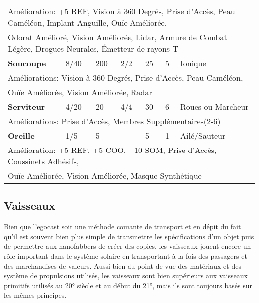 \begin{table}
\begin{tabular}{|l|l|l|l|l|l|l|}
\multicolumn{7}{|l|}{Amélioration: +5 REF, Vision à 360 Degrés, Prise d'Accès, Peau Caméléon, Implant Anguille, Ouïe Améliorée, } \\ \multicolumn{7}{|l|}{Odorat Amélioré, Vision Améliorée, Lidar, Armure de Combat Légère, Drogues Neurales, Émetteur de rayons-T} \\ \hline

\textbf{Soucoupe}	&8/40	&200	&2/2	&25	&5	&Ionique \\ \hline

\multicolumn{7}{|l|}{Améliorations: Vision à 360 Degrés, Prise d'Accès, Peau Caméléon, } \\ \multicolumn{7}{|l|}{Ouïe Améliorée, Vision Améliorée, Radar} \\ \hline

\textbf{Serviteur}	&4/20	&20	&4/4	&30	&6	&Roues ou Marcheur\\ \hline

\multicolumn{7}{|l|}{Améliorations: Prise d'Accès, Membres Supplémentaires(2-6)} \\ \hline

\textbf{Oreille}	&1/5	&5	&- &5	&1	&Ailé/Sauteur\\ \hline

\multicolumn{7}{|l|}{Amélioration: +5 REF, +5 COO, $-$10 SOM, Prise d'Accès, Coussinets Adhésifs, } \\ \multicolumn{7}{|l|}{Ouïe Améliorée, Vision Améliorée, Masque Synthétique} \\ \hline

\end{tabular} \label{tab:robots} \end{table} 

\subsection{Vaisseaux} \label{sec:spacecraft} 

Bien que l'egocast soit une méthode courante de transport et en dépit du fait qu'il est souvent bien plus simple de transmettre les spécifications d'un objet puis de permettre aux nanofabbers de créer des copies, les vaisseaux jouent encore un rôle important dans le système solaire en transportant à la fois des passagers et des marchandises de valeurs. Aussi bien du point de vue des matériaux et des système de propulsions utilisés, les vaisseaux sont bien supérieurs aux vaisseaux primitifs utilisés au 20° siècle et au début du 21°, mais ils sont toujours basés sur les mêmes principes. 

